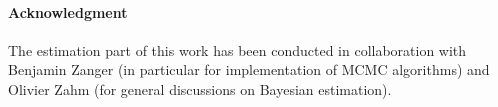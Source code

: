 \documentclass[draft]{agujournal2019}
\newcommand{\blu}[1]{{\color{BlueGreen} #1}}
\begin{document}
\paragraph{Acknowledgment} The estimation part of this work has been conducted in collaboration with Benjamin Zanger (in particular for implementation of MCMC algorithms) and Olivier Zahm (for general discussions on Bayesian estimation).
%
\appendix
%
\end{document}
